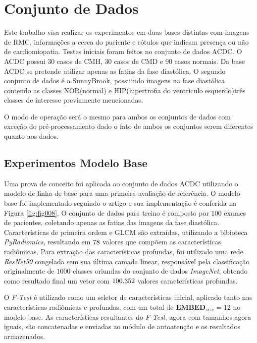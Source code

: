 \section{Conjunto de Dados} 
\label{subsec:cap5_dataset}

Este trabalho visa realizar os experimentos em duas bases distintas com imagens de \gls{RMC}, informações a cerca do paciente e rótulos que indicam presença ou não de cardiomiopatia. Testes iniciais foram feitos no conjunto de dados \gls{ACDC}. O \gls{ACDC} possui $30$ casos de \gls{CMH}, $30$ casos de \gls{CMD} e $90$ casos normais. Da base \gls{ACDC} se pretende utilizar apenas as fatias da fase diastólica. O segundo conjunto de dados é o SunnyBrook, possuindo imagens na fase diastólica contendo as classes NOR(normal) e HIP(hipertrofia do ventrículo esquerdo)três classes de interesse previamente mencionadas. 

O modo de operação será o mesmo para ambos os conjuntos de dados com exceção do pré-processamento dado o fato de ambos os conjuntos serem diferentes quanto aos dados.

\subsection{Experimentos Modelo Base}
\label{subsec:cap5_experimentos_base}

Uma prova de conceito foi aplicada ao conjunto de dados \gls{ACDC} utilizando o modelo de linha de base para uma primeira avaliação de referência. O modelo base foi implementado seguindo o artigo e sua implementação é conferida na Figura \ref{fig:fig008}. O conjunto de dados para treino é composto por $100$ exames de pacientes, coletando apenas as fatias das imagens da fase diastólica. Características de primeira ordem e \gls{GLCM} são extraídas, utilizando a blbioteca \textit{PyRadiomics}, resultando em $78$ valores que compõem as características radiômicas. Para extração das características profundas, foi utilizado uma rede \textit{ResNet50} congelada sem sua última camada linear, responsável pela classificação originalmente de $1000$ classes oriundas do conjunto de dados \textit{ImageNet}, obtendo como resultado final um vetor com $100.352$ valores características profundas.

O \textit{F-Test} é utilizado como um seletor de características inicial, aplicado tanto nas características radiômicas e profundas, com um total de $\textbf{EMBED}_{size} = 12$  no modelo base. As características resultantes do \textit{F-Test}, agora com tamanhos agora iguais, são concatenadas e enviadas ao módulo de autoatenção e os resultados armazenados.

